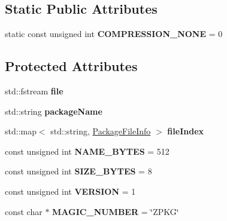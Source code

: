 \subsection*{Static Public Attributes}
\begin{DoxyCompactItemize}
\item 
\mbox{\label{classzt_1_1_package_affccb63e5c40c8ab8cd8a4bab5db6914}} 
static const unsigned int {\bfseries C\+O\+M\+P\+R\+E\+S\+S\+I\+O\+N\+\_\+\+N\+O\+NE} = 0
\end{DoxyCompactItemize}
\subsection*{Protected Attributes}
\begin{DoxyCompactItemize}
\item 
\mbox{\label{classzt_1_1_package_a6937a1bdbb54efd3dd0184590f72a038}} 
std\+::fstream {\bfseries file}
\item 
\mbox{\label{classzt_1_1_package_a178f1e16598632e9a28a36c244afadc8}} 
std\+::string {\bfseries package\+Name}
\item 
\mbox{\label{classzt_1_1_package_aed3f124a5138a835ab59d001fd24b8bf}} 
std\+::map$<$ std\+::string, \hyperlink{classzt_1_1_package_file_info}{Package\+File\+Info} $>$ {\bfseries file\+Index}
\item 
\mbox{\label{classzt_1_1_package_a06cb77eccd578fe53a04d9b8b9b0c002}} 
const unsigned int {\bfseries N\+A\+M\+E\+\_\+\+B\+Y\+T\+ES} = 512
\item 
\mbox{\label{classzt_1_1_package_ace3614899778aca2fb25bd0cf1bacb8f}} 
const unsigned int {\bfseries S\+I\+Z\+E\+\_\+\+B\+Y\+T\+ES} = 8
\item 
\mbox{\label{classzt_1_1_package_a02b53b1351ab587787171e9d4a80a424}} 
const unsigned int {\bfseries V\+E\+R\+S\+I\+ON} = 1
\item 
\mbox{\label{classzt_1_1_package_a0a744c3d635b242b2312465822b59dbc}} 
const char $\ast$ {\bfseries M\+A\+G\+I\+C\+\_\+\+N\+U\+M\+B\+ER} = \char`\"{}Z\+P\+KG\char`\"{}
\end{DoxyCompactItemize}


